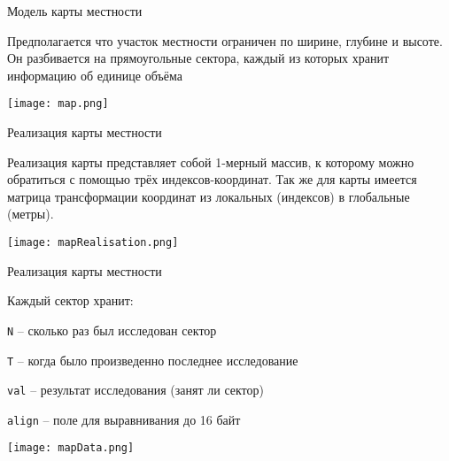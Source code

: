 \begin{tslide}{Модель карты местности}

    Предполагается что участок местности ограничен по ширине,
    глубине и высоте.
    Он разбивается на прямоугольные сектора, каждый из которых хранит
    информацию об единице объёма

    \begin{center}
    \texttt{[image: map.png]}
    \end{center}

\end{tslide}

\begin{tslide}{Реализация карты местности}

    Реализация карты представляет собой 1-мерный массив,
    к которому можно обратиться с помощью трёх индексов-координат.
    Так же для карты имеется матрица трансформации координат
    из локальных (индексов) в глобальные (метры).

    \begin{center}
    \texttt{[image: mapRealisation.png]}
    \end{center}

\end{tslide}

\begin{tslide}{Реализация карты местности}

    Каждый сектор хранит:

    \begin{mintemize}
    \item {\Large\verb|N|} -- сколько раз был исследован сектор
    \item {\Large\verb|T|} -- когда было произведенно последнее исследование
    \item {\Large\verb|val|} -- результат исследования (занят ли сектор)
    \item {\Large\verb|align|} -- поле для выравнивания до 16 байт
    \end{mintemize}

    \vfill

    \begin{center}
    \texttt{[image: mapData.png]}
    \end{center}

    \vfill

\end{tslide}

